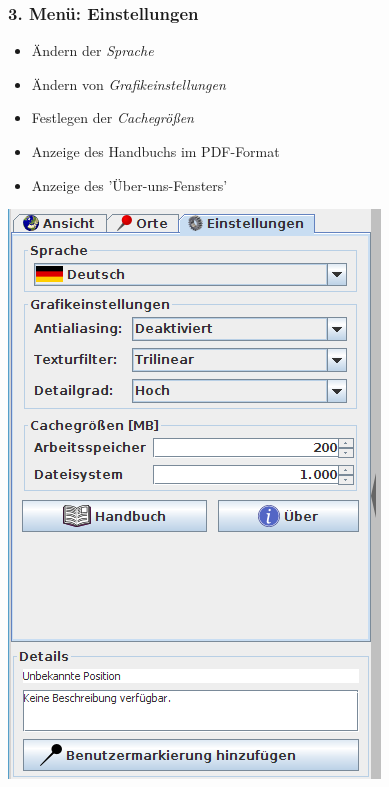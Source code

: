 \documentclass[10pt]{scrreprt}
\newcommand{\textref}[1]{\mbox{\raisebox{0.1ex}{\small$\rightarrow$ }\textit{#1}}}
\begin{document}
\newpage
\begin{minipage}[t]{9cm}
\vspace{-40mm}
\subsubsection{3. Menü: Einstellungen} 
	\begin{itemize}
	\item Ändern der \textref{Sprache}  
	\item Ändern von \textref{Grafikeinstellungen} 
	\item Festlegen der \textref{Cachegrößen} 
	\item Anzeige des Handbuchs im PDF-Format
	\item Anzeige des 'Über-uns-Fensters'
	\end{itemize}
\end{minipage}
\begin{minipage}{7cm}
\centering
\includegraphics[scale=0.4]{images/einstellungen_tab_DE.png}
\end{minipage}
\end{document}
